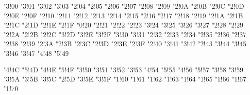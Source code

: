 \mathchardef\shortleftarrow"3!00
\mathchardef\shortrightarrow"3!01
\mathchardef\shortuparrow"3!02
\mathchardef\shortdownarrow"3!03
\mathchardef\Yup"2!04
\mathchardef\Ydown"2!05
\mathchardef\Yleft"2!06
\mathchardef\Yright"2!07
\mathchardef\varcurlyvee"2!08
\mathchardef\varcurlywedge"2!09
\mathchardef\minuso"2!0A
\mathchardef\baro"2!0B
\mathchardef\sslash"2!0C
\mathchardef\bbslash"2!0D
\mathchardef\moo"2!0E
\mathchardef\varotimes"2!0F
\mathchardef\varoast"2!10
\mathchardef\varobar"2!11
\mathchardef\varodot"2!12
\mathchardef\varoslash"2!13
\mathchardef\varobslash"2!14
\mathchardef\varocircle"2!15
\mathchardef\varoplus"2!16
\mathchardef\varominus"2!17
\mathchardef\boxast"2!18
\mathchardef\boxbar"2!19
\mathchardef\boxdot"2!1A
\mathchardef\boxslash"2!1B
\mathchardef\boxbslash"2!1C
\mathchardef\boxcircle"2!1D
\mathchardef\boxbox"2!1E
\mathchardef\boxempty"2!1F
\mathchardef\lightning"0!20
\mathchardef\merge"2!21
\mathchardef\vartimes"2!22
\mathchardef\fatsemi"2!23
\mathchardef\sswarrow"3!24
\mathchardef\ssearrow"3!25
\mathchardef\curlywedgeuparrow"3!26
\mathchardef\curlywedgedownarrow"3!27
\mathchardef\fatslash"2!28
\mathchardef\fatbslash"2!29
\mathchardef\lbag"2!2A
\mathchardef\rbag"2!2B
\mathchardef\varbigcirc"2!2C
\mathchardef\leftrightarroweq"3!2D
\mathchardef\curlyveedownarrow"3!2E
\mathchardef\curlyveeuparrow"3!2F
\mathchardef\nnwarrow"3!30
\mathchardef\nnearrow"3!31
\mathchardef\leftslice"2!32
\mathchardef\rightslice"2!33
\mathchardef\varolessthan"2!34
\mathchardef\varogreaterthan"2!35
\mathchardef\varovee"2!36
\mathchardef\varowedge"2!37
\mathchardef\talloblong"2!38
\mathchardef\interleave"2!39
\mathchardef\obar"2!3A
\mathchardef\obslash"2!3B
\mathchardef\olessthan"2!3C
\mathchardef\ogreaterthan"2!3D
\mathchardef\ovee"2!3E
\mathchardef\owedge"2!3F
\mathchardef\oblong"2!40
\mathchardef\inplus"3!41
\mathchardef\niplus"3!42
\mathchardef\nplus"2!43
\mathchardef\subsetplus"3!44
\mathchardef\supsetplus"3!45
\mathchardef\subsetpluseq"3!46
\mathchardef\supsetpluseq"3!47
\mathchardef\Lbag"4!48
\mathchardef\Rbag"5!49

\mathchardef\llparenthesis"4!4C
\mathchardef\rrparenthesis"5!4D
\mathchardef\binampersand"4!4E
\mathchardef\bindnasrepma"5!4F
\mathchardef\trianglelefteqslant"3!50
\mathchardef\trianglerighteqslant"3!51
\mathchardef\ntrianglelefteqslant"3!52
\mathchardef\ntrianglerighteqslant"3!53
\mathchardef\llfloor"4!54
\mathchardef\rrfloor"5!55
\mathchardef\llceil"4!56
\mathchardef\rrceil"5!57
\mathchardef\arrownot"3!58
\mathchardef\Arrownot"3!59
\mathchardef\Mapstochar"3!5A
\mathchardef\mapsfromchar"3!5B
\mathchardef\Mapsfromchar"3!5C
\mathchardef\leftrightarrowtriangle"2!5D
\mathchardef\leftarrowtriangle"3!5E
\mathchardef\rightarrowtriangle"3!5F
\mathchardef\bigtriangledown"1!60
\mathchardef\bigtriangleup"1!61
\mathchardef\bigcurlyvee"1!62
\mathchardef\bigcurlywedge"1!63
\mathchardef\bigsqcap"1!64
\mathchardef\bigbox"1!65
\mathchardef\bigparallel"1!66
\mathchardef\biginterleave"1!67
\mathchardef\bignplus"1!70

